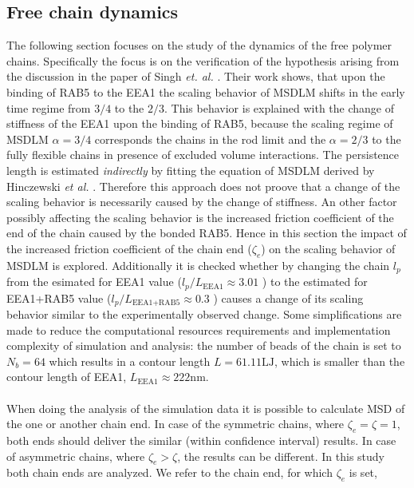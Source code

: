 \documentclass[
    paper=A4,pagesize=automedia,fontsize=12pt,
    BCOR=15mm,DIV=22,
    twoside,headinclude,footinclude=false,
    fleqn,             %
    bibliography=totocnumbered,          %
    listof=totoc,                %
    listof=flat,                 %
    cleardoublepage=empty      %
    numbers=endperiod
]{scrartcl}
\begin{document}
\subsection{Free chain dynamics} \label{sec:free_chain_dynamicss}
The following section focuses on the study of the dynamics of the 
free polymer chains. Specifically the focus is on the verification
of the hypothesis arising from the discussion in the paper of 
Singh \emph{et. al.} \cite{Singh:2022}. Their work shows, that upon the 
binding of RAB5 to the EEA1 the scaling behavior of MSDLM shifts in 
the early time regime from $3/4$ to the $2/3$. This behavior is explained
with the change of stiffness of the EEA1 upon the binding of RAB5, because
the scaling regime of MSDLM $\alpha=3/4$ corresponds the chains in the rod limit
and the $\alpha=2/3$ to the fully flexible chains in presence of excluded
volume interactions. The persistence length is estimated \emph{indirectly} by 
fitting the equation of MSDLM \cite{Singh:2022} derived by 
Hinczewski \emph{et al.} \cite{Hinczewski_2009}. Therefore this approach does
not proove that a change of the scaling behavior is necessarily caused by the change
of stiffness. An other factor possibly affecting the scaling behavior
is the increased friction coefficient of the end of the chain caused by the
bonded RAB5. Hence in this section the impact of the increased friction 
coefficient of the chain end ($\zeta_e$) on the scaling behavior of MSDLM is explored.
Additionally it is checked whether by changing the chain $l_p$ from the 
esimated for EEA1 value ($l_p/L_{\text{EEA1}} \approx 3.01$ \cite{Singh:2022}) to
the estimated for EEA1+RAB5 value 
($l_p/L_{\text{EEA1+RAB5}} \approx 0.3$ \cite{Singh:2022}) causes a change of its 
scaling behavior similar to the experimentally observed change.
Some simplifications are made to reduce the computational resources
requirements and implementation complexity of simulation and analysis:
the number of beads of the chain is set to $N_b=64$ which results in a
contour length $L=61.11\text{LJ}$, which is smaller than the contour length of EEA1,
$L_{\text{EEA1}}\approx222\text{nm}$.
\\
\\
When doing the analysis of the simulation data it is possible to 
calculate MSD of the one or another
chain end. In case of the symmetric chains, where $\zeta_e=\zeta=1$, both ends should 
deliver the similar (within confidence interval) results. In case of asymmetric chains,
where $\zeta_e > \zeta$, the results can be different. In this study
both chain ends are analyzed. We refer to the chain end, for which $\zeta_e$ is set,
\end{document}
